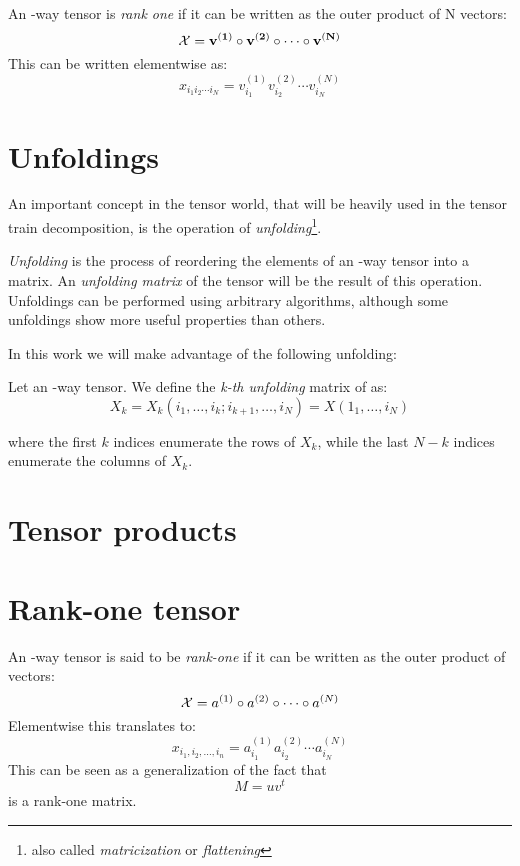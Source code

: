 \begin{Def}
  An \N-way tensor \X is \emph{rank one} if it can be written as the outer product of N vectors:
  \[
  \mathcal{X} = \mathbf{v^{(1)}} \circ \mathbf{v^{(2)}} \circ \cdots \circ \mathbf{v^{(N)}}
  \]
  This can be written elementwise as:
  \[
  x_{i_1 i_2 \cdots i_N} = v_{i_1}^{(1)} v_{i_2}^{(2)} \cdots v_{i_N}^{(N)}
  \]
\end{Def}

\section{Unfoldings}
An important concept in the tensor world, that will be heavily used in the tensor train decomposition, is the operation of \emph{unfolding}\footnote{also called \emph{matricization} or \emph{flattening}}.

\emph{Unfolding} is the process of reordering the elements of an \N-way tensor into a matrix. An \emph{unfolding matrix} of the tensor will be the result of this operation. Unfoldings can be performed using arbitrary algorithms, although some unfoldings show more useful properties than others.

In this work we will make advantage of the following unfolding:

\begin{Def}
  Let \X an \N-way tensor. We define the \emph{k-th unfolding} matrix of \X as:
  \begin{equation} \label{def:unfolding}
    X_k = X_k(i_1,\dots,i_k;i_{k+1},\dots,i_N) = X(1_1,\dots,i_N)
  \end{equation}

where the first $k$ indices enumerate the rows of $X_k$, while the last $N - k$ indices enumerate the columns of $X_k$.
\end{Def}

\section{Tensor products}

\section{Rank-one tensor}
An \N-way tensor \X is said to be \emph{rank-one} if it can be written as the outer product of \N vectors:
\begin{equation}
  \mathcal{X} = a^{(1)} \circ a^{(2)} \circ \cdots \circ a^{(N)}
\end{equation}
Elementwise this translates to:
\begin{equation}
  x_{i_1,i_2,\ldots,i_n} = a_{i_1}^{(1)} a_{i_2}^{(2)} \cdots a_{i_N}^{(N)}
\end{equation}
This can be seen as a generalization of the fact that
\begin{equation*}
  M = u v^t
\end{equation*}
is a rank-one matrix.


